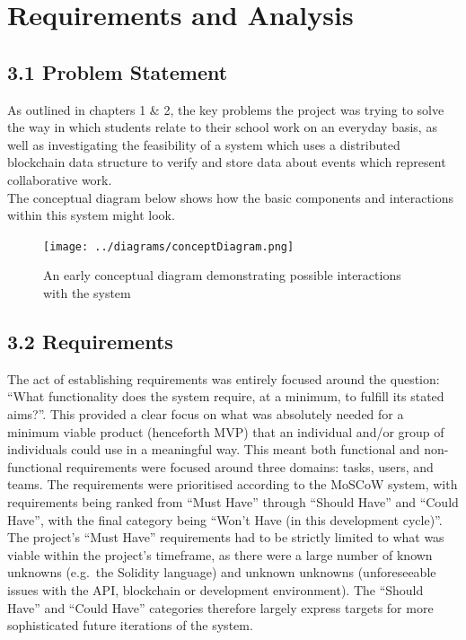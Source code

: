 \chapter{Requirements and Analysis}

\section{3.1 Problem Statement}\label{problem-statement}

As outlined in chapters 1 \& 2, the key problems the project was trying
to solve the way in which students relate to their school work on an
everyday basis, as well as investigating the feasibility of a system
which uses a distributed blockchain data structure to verify and store
data about events which represent collaborative work.\\
The conceptual diagram below shows how the basic components and
interactions within this system might look.

\begin{figure}[htbp]
\centering
\texttt{[image: ../diagrams/conceptDiagram.png]}
\caption{An early conceptual diagram demonstrating possible interactions
with the system}
\end{figure}

\section{3.2 Requirements}\label{requirements}

The act of establishing requirements was entirely focused around the
question: ``What functionality does the system require, at a minimum, to
fulfill its stated aims?''. This provided a clear focus on what was
absolutely needed for a minimum viable product (henceforth
MVP)\cite{ries2009minimum} that an individual and/or group of individuals could use in
a meaningful way. This meant both functional and non-functional
requirements were focused around three domains: tasks, users, and teams.
The requirements were prioritised according to the MoSCoW
system\cite{1moscow},
with requirements being ranked from ``Must Have'' through ``Should
Have'' and ``Could Have'', with the final category being ``Won't Have
(in this development cycle)''. The project's ``Must Have'' requirements
had to be strictly limited to what was viable within the project's
timeframe, as there were a large number of known unknowns (e.g.~the
Solidity language) and unknown unknowns (unforeseeable issues with the
API, blockchain or development environment). The ``Should Have'' and
``Could Have'' categories therefore largely express targets for more
sophisticated future iterations of the system.

